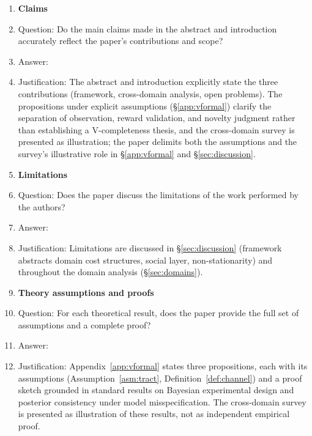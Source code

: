 \documentclass{article}
\begin{document}
\begin{enumerate}

\item {\bf Claims}
    \item[] Question: Do the main claims made in the abstract and introduction accurately reflect the paper's contributions and scope?
    \item[] Answer: \answerYes{}
    \item[] Justification: The abstract and introduction explicitly state the three contributions (framework, cross-domain analysis, open problems). The propositions under explicit assumptions (\S\ref{app:vformal}) clarify the separation of observation, reward validation, and novelty judgment rather than establishing a V-completeness thesis, and the cross-domain survey is presented as illustration; the paper delimits both the assumptions and the survey's illustrative role in \S\ref{app:vformal} and \S\ref{sec:discussion}.

\item {\bf Limitations}
    \item[] Question: Does the paper discuss the limitations of the work performed by the authors?
    \item[] Answer: \answerYes{}
    \item[] Justification: Limitations are discussed in \S\ref{sec:discussion} (framework abstracts domain cost structures, social layer, non-stationarity) and throughout the domain analysis (\S\ref{sec:domains}).

\item {\bf Theory assumptions and proofs}
    \item[] Question: For each theoretical result, does the paper provide the full set of assumptions and a complete proof?
    \item[] Answer: \answerYes{}
    \item[] Justification: Appendix~\ref{app:vformal} states three propositions, each with its assumptions (Assumption~\ref{asm:tract}, Definition~\ref{def:channel}) and a proof sketch grounded in standard results on Bayesian experimental design and posterior consistency under model misspecification. The cross-domain survey is presented as illustration of these results, not as independent empirical proof.


\end{enumerate}
\end{document}
